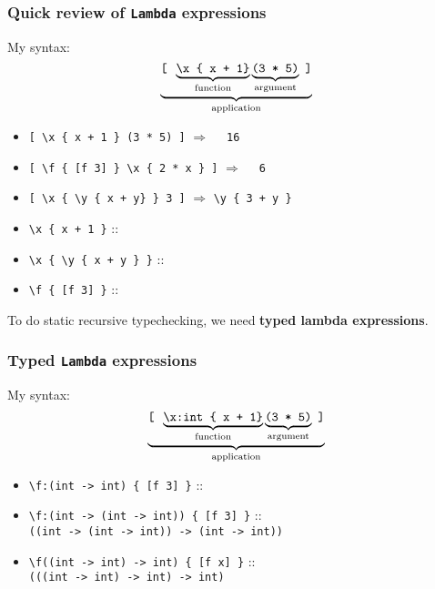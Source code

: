 \documentclass{beamer}
\begin{document}
\begin{frame}[fragile]
\frametitle{Quick review of {\tt Lambda} expressions}
My syntax:
\[
\underbrace{
  \text{\tt [ }
  \underbrace{\text{\tt \textbackslash x \{ x + 1\}}}_{\text{function}}
  \underbrace{\text{\tt (3 * 5)}}_{\text{argument}}
  \text{ \tt ]}
}_{\text{application}}
\]
\pause
\begin{itemize}
\item \verb|[ \x { x + 1 } (3 * 5) ]|  $\Rightarrow$ \pause \verb|  16| \pause
\item \verb|[ \f { [f 3] } \x { 2 * x } ]|  $\Rightarrow$ \pause \verb|  6|\pause
\item \verb|[ \x { \y { x + y} } 3 ]|  $\Rightarrow$ \pause \verb|\y { 3 + y }| \pause
\end{itemize}
\begin{itemize}
\item \verb|\x { x + 1 }|  :: \pause
\item \verb|\x { \y { x + y } }| ::  \pause
\item \verb|\f { [f 3] }| :: 
\end{itemize}
\pause
To do static  recursive typechecking, we need 
{\bf typed lambda expressions}.

\end{frame}

\begin{frame}[fragile]
\frametitle{Typed {\tt Lambda} expressions}
My syntax:
\[
\underbrace{
  \text{\tt [ }
  \underbrace{\text{\tt \textbackslash x:int \{ x + 1\}}}_{\text{function}}
  \underbrace{\text{\tt (3 * 5)}}_{\text{argument}}
  \text{ \tt ]}
}_{\text{application}}
\]
\pause

\begin{itemize}
\item \verb|\f:(int -> int) { [f 3] }| :: 
\item \verb|\f:(int -> (int -> int)) { [f 3] }| :: \pause \\
{\tt ((int -> (int -> int)) -> (int -> int))}
\item \verb|\f((int -> int) -> int) { [f x] }| :: \pause \\
{\tt (((int -> int) -> int) -> int)}
\end{itemize}

\end{frame}
\end{document}
